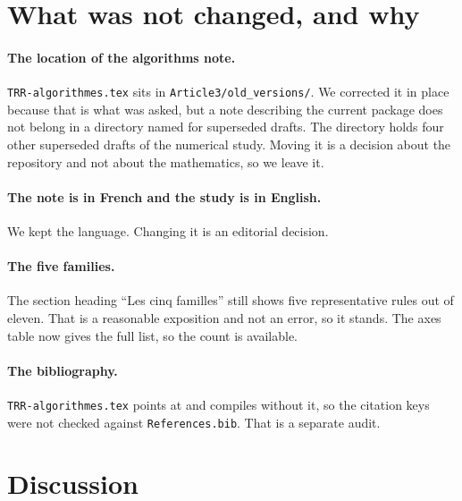 \documentclass[11pt,a4paper]{article}
\begin{document}
\section{What was not changed, and why}\label{sec: notchanged}

\paragraph{The location of the algorithms note.}
\texttt{TRR-algorithmes.tex} sits in \texttt{Article3/old\_versions/}. We
corrected it in place because that is what was asked, but a note describing the
current package does not belong in a directory named for superseded drafts. The
directory holds four other superseded drafts of the numerical study. Moving it
is a decision about the repository and not about the mathematics, so we leave it.

\paragraph{The note is in French and the study is in English.}
We kept the language. Changing it is an editorial decision.

\paragraph{The five families.}
The section heading ``Les cinq familles'' still shows five representative rules
out of eleven. That is a reasonable exposition and not an error, so it stands.
The axes table now gives the full list, so the count is available.

\paragraph{The bibliography.}
\texttt{TRR-algorithmes.tex} points at \verb|| and
compiles without it, so the citation keys were not checked against
\texttt{References.bib}. That is a separate audit.

\section{Discussion}\label{sec: discussion}
\end{document}
